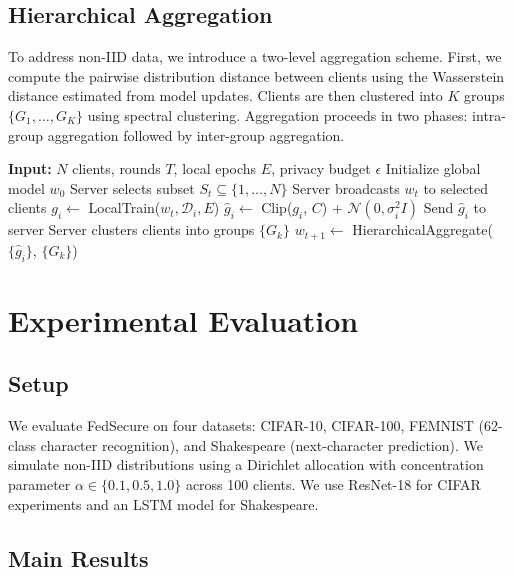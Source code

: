 \documentclass[conference]{IEEEtran}
\begin{document}
\subsection{Hierarchical Aggregation}

To address non-IID data, we introduce a two-level aggregation scheme. First, we compute the pairwise distribution distance between clients using the Wasserstein distance estimated from model updates. Clients are then clustered into $K$ groups $\{G_1, \ldots, G_K\}$ using spectral clustering. Aggregation proceeds in two phases: intra-group aggregation followed by inter-group aggregation.

\begin{algorithm}[t]
\caption{FedSecure Training Protocol}
\begin{algorithmic}[1]
\STATE \textbf{Input:} $N$ clients, rounds $T$, local epochs $E$, privacy budget $\epsilon$
\STATE Initialize global model $w_0$
  \STATE Server selects subset $S_t \subseteq \{1,\ldots,N\}$
  \STATE Server broadcasts $w_t$ to selected clients
    \STATE $g_i \leftarrow$ LocalTrain($w_t, \mathcal{D}_i, E$)
    \STATE $\hat{g}_i \leftarrow$ Clip($g_i$, $C$) + $\mathcal{N}(0, \sigma_i^2 I)$
    \STATE Send $\hat{g}_i$ to server
  \ENDFOR
  \STATE Server clusters clients into groups $\{G_k\}$
  \STATE $w_{t+1} \leftarrow$ HierarchicalAggregate($\{\hat{g}_i\}$, $\{G_k\}$)
\ENDFOR
\end{algorithmic}
\end{algorithm}

\section{Experimental Evaluation}

\subsection{Setup}

We evaluate FedSecure on four datasets: CIFAR-10, CIFAR-100, FEMNIST (62-class character recognition), and Shakespeare (next-character prediction). We simulate non-IID distributions using a Dirichlet allocation with concentration parameter $\alpha \in \{0.1, 0.5, 1.0\}$ across 100 clients. We use ResNet-18 for CIFAR experiments and an LSTM model for Shakespeare.

\subsection{Main Results}
\end{document}
